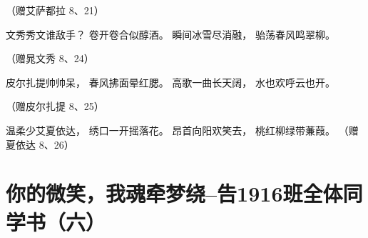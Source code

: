 \documentclass[openany]{ctexbook}
\begin{document}
（赠艾萨都拉 8、21）

文秀秀文谁敌手？ 卷开卷合似醇酒。 瞬间冰雪尽消融， 骀荡春风鸣翠柳。

（赠晁文秀 8、24）

皮尔扎提帅帅呆， 春风拂面晕红腮。 高歌一曲长天阔， 水也欢呼云也开。

（赠皮尔扎提 8、25）

温柔少艾夏依达， 绣口一开摇落花。 昂首向阳欢笑去， 桃红柳绿带蒹葭。
（赠夏依达 8、26）

\chapter*{你的微笑，我魂牵梦绕--告1916班全体同学书（六）}\label{letter6}
\end{document}
